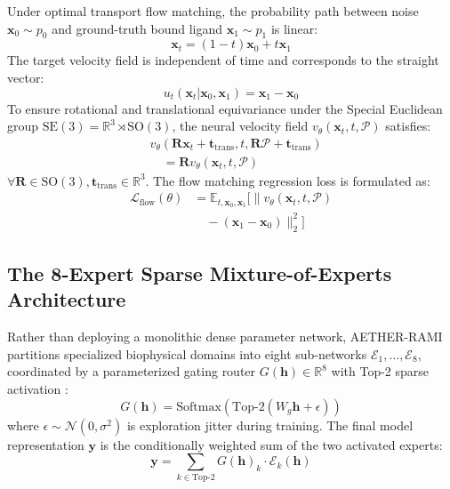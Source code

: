\documentclass[10pt,journal,compsoc]{IEEEtran}
\begin{document}
Under optimal transport flow matching, the probability path between noise $\mathbf{x}_0 \sim p_0$ and ground-truth bound ligand $\mathbf{x}_1 \sim p_1$ is linear:
\begin{equation}
\mathbf{x}_t = (1 - t)\mathbf{x}_0 + t\mathbf{x}_1
\label{eq:ot_path}
\end{equation}
The target velocity field is independent of time and corresponds to the straight vector:
\begin{equation}
u_t(\mathbf{x}_t | \mathbf{x}_0, \mathbf{x}_1) = \mathbf{x}_1 - \mathbf{x}_0
\label{eq:ot_velocity}
\end{equation}
To ensure rotational and translational equivariance under the Special Euclidean group $\mathrm{SE}(3) = \mathbb{R}^3 \rtimes \mathrm{SO}(3)$, the neural velocity field $v_\theta(\mathbf{x}_t, t, \mathcal{P})$ satisfies:
\begin{equation}
\begin{split}
&v_\theta(\mathbf{R}\mathbf{x}_t + \mathbf{t}_{\text{trans}}, t, \mathbf{R}\mathcal{P} + \mathbf{t}_{\text{trans}}) \\
&\quad = \mathbf{R} v_\theta(\mathbf{x}_t, t, \mathcal{P})
\end{split}
\label{eq:se3_equiv}
\end{equation}
$\forall \mathbf{R} \in \mathrm{SO}(3), \mathbf{t}_{\text{trans}} \in \mathbb{R}^3$. The flow matching regression loss is formulated as:
\begin{equation}
\begin{split}
\mathcal{L}_{\text{flow}}(\theta) &= \mathbb{E}_{t, \mathbf{x}_0, \mathbf{x}_1} \Big[ \big\| v_\theta(\mathbf{x}_t, t, \mathcal{P}) \\
&\quad - (\mathbf{x}_1 - \mathbf{x}_0) \big\|_2^2 \Big]
\end{split}
\label{eq:flow_loss}
\end{equation}

\subsection{The 8-Expert Sparse Mixture-of-Experts Architecture}
Rather than deploying a monolithic dense parameter network, AETHER-RAMI partitions specialized biophysical domains into eight sub-networks $\mathcal{E}_1, \dots, \mathcal{E}_8$, coordinated by a parameterized gating router $G(\mathbf{h}) \in \mathbb{R}^8$ with Top-2 sparse activation \cite{shazeer2017outrageously}:
\begin{equation}
G(\mathbf{h}) = \text{Softmax}\left( \text{Top-2}\left( W_g \mathbf{h} + \epsilon \right) \right)
\label{eq:moe_gate}
\end{equation}
where $\epsilon \sim \mathcal{N}(0, \sigma^2)$ is exploration jitter during training. The final model representation $\mathbf{y}$ is the conditionally weighted sum of the two activated experts:
\begin{equation}
\mathbf{y} = \sum_{k \in \text{Top-2}} G(\mathbf{h})_k \cdot \mathcal{E}_k(\mathbf{h})
\label{eq:moe_output}
\end{equation}
\end{document}
